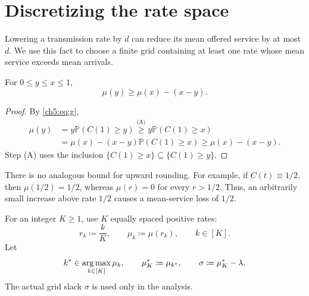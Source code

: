 \section{Discretizing the rate space}
\label{ch5:sec:discretization}

Lowering a transmission rate by $d$ can reduce its mean offered service by
at most $d$. We use this fact to choose a finite grid containing at least
one rate whose mean service exceeds mean arrivals.

\begin{Thm:Lemma}
\label{ch5:lem:onesided}
For $0\le y\le x\le1$,
\begin{equation}
 \mu(y)\ge \mu(x)-(x-y).
 \label{ch5:eq:onesided}
\end{equation}
\end{Thm:Lemma}
\begin{proof}
By \eqref{ch5:eq:g},
\begin{align*}
\mu(y)
&=y\mathbb P(C(1)\ge y)
 \overset{\text{(A)}}{\ge}y\mathbb P(C(1)\ge x)\\
&=\mu(x)-(x-y)\mathbb P(C(1)\ge x)
 \ge\mu(x)-(x-y).
\end{align*}
Step (A) uses the inclusion
$\{C(1)\ge x\}\subseteq\{C(1)\ge y\}$.
\end{proof}

\begin{Thm:Remark}
There is no analogous bound for upward rounding. For example, if
$C(t)\equiv1/2$, then $\mu(1/2)=1/2$, whereas $\mu(r)=0$ for every
$r>1/2$. Thus, an arbitrarily small increase above rate $1/2$ causes
a mean-service loss of $1/2$.
\end{Thm:Remark}

For an integer $K\ge1$, use $K$ equally spaced positive rates:
\begin{equation}
 r_k\coloneqq\frac{k}{K},\qquad \mu_k\coloneqq\mu(r_k),\qquad k\in[K].
 \label{ch5:eq:grid-rates}
\end{equation}
Let
\begin{equation}
 k^*\in\operatorname*{arg\,max}_{k\in[K]}\mu_k,
 \qquad \mu_K^*\coloneqq\mu_{k^*},\qquad \sigma\coloneqq\mu_K^*-\lambda.
 \label{ch5:eq:grid-slack}
\end{equation}
The actual grid slack $\sigma$ is used only in the analysis.

